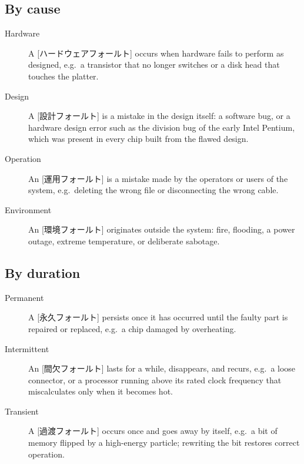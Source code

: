\documentclass[../main.tex]{subfiles}
\begin{document}
\subsection{By cause}

\begin{description}
  \item[Hardware] A [ハードウェアフォールト] occurs when
    hardware fails to perform as designed, e.g.\ a transistor that no longer
    switches or a disk head that touches the platter.
  \item[Design] A [設計フォールト] is a mistake in the
    design itself: a software bug, or a hardware design error such as the
    division bug of the early Intel Pentium, which was present in every chip
    built from the flawed design.
  \item[Operation] An [運用フォールト] is a mistake
    made by the operators or users of the system, e.g.\ deleting the wrong
    file or disconnecting the wrong cable.
  \item[Environment] An [環境フォールト] originates
    outside the system: fire, flooding, a power outage, extreme temperature,
    or deliberate sabotage.
\end{description}

\subsection{By duration}

\begin{description}
  \item[Permanent] A [永久フォールト] persists once it
    has occurred until the faulty part is repaired or replaced, e.g.\ a
    chip damaged by overheating.
  \item[Intermittent] An [間欠フォールト] lasts for
    a while, disappears, and recurs, e.g.\ a loose connector, or a processor
    running above its rated clock frequency that miscalculates only when it
    becomes hot.
  \item[Transient] A [過渡フォールト] occurs once and
    goes away by itself, e.g.\ a bit of memory flipped by a high-energy
    particle; rewriting the bit restores correct operation.
\end{description}
\end{document}
